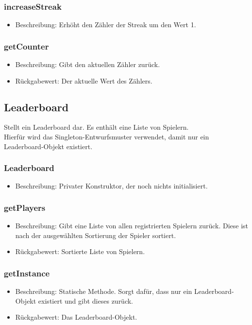 \documentclass[a4paper]{scrreprt}
\begin{document}
    \subsubsection{increaseStreak}
    \begin{itemize}
        \item Beschreibung: Erhöht den Zähler der Streak um den Wert 1.
    \end{itemize}
    \subsubsection{getCounter}
    \begin{itemize}
        \item Beschreibung: Gibt den aktuellen Zähler zurück.
        \item Rückgabewert: Der aktuelle Wert des Zählers.
    \end{itemize}


    \subsection{Leaderboard}
    Stellt ein Leaderboard dar. Es enthält eine Liste von Spielern. \\
    Hierfür wird das Singleton-Entwurfsmuster verwendet, damit nur ein Leaderboard-Objekt existiert.

    \subsubsection{Leaderboard}
    \begin{itemize}
        \item Beschreibung: Privater Konstruktor, der noch nichts initialisiert.
    \end{itemize}
    \subsubsection{getPlayers}
    \begin{itemize}
        \item Beschreibung: Gibt eine Liste von allen registrierten Spielern zurück. Diese ist nach der ausgewählten Sortierung der Spieler sortiert.
        \item Rückgabewert: Sortierte Liste von Spielern.
    \end{itemize}
    \subsubsection{getInstance}
    \begin{itemize}
        \item Beschreibung: Statische Methode. Sorgt dafür, dass nur ein Leaderboard-Objekt existiert und gibt dieses zurück.
        \item Rückgabewert: Das Leaderboard-Objekt.
    \end{itemize}
\end{document}
